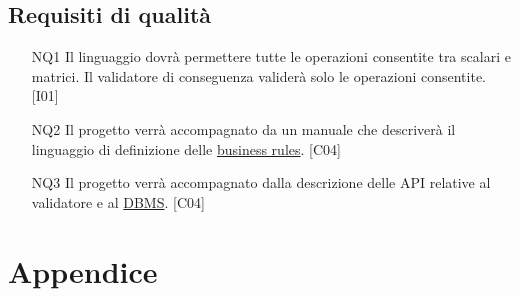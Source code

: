 \section{Requisiti di qualit\`a}
\begin{itemize}
\item[NQ1]{Il linguaggio dovr\`a permettere tutte le operazioni consentite tra scalari e matrici. Il validatore di conseguenza valider\`a solo le operazioni consentite. [I01]}
\item[NQ2]{Il progetto verr\`a accompagnato da un manuale che descriver\`a il linguaggio di definizione delle \underline{business rules}. [C04]}
\item[NQ3]{Il progetto verr\`a accompagnato dalla descrizione delle API relative al validatore e al \underline{DBMS}. [C04]}
\end{itemize}
\newpage


\chapter{Appendice}
